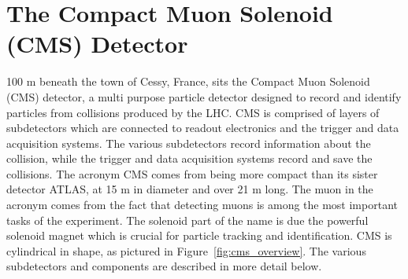 \section{The Compact Muon Solenoid (CMS) Detector}
\label{sec:cms}
100 m beneath the town of Cessy, France, sits the Compact Muon Solenoid (CMS) detector, a multi purpose particle detector designed
to record and identify particles from collisions produced by the LHC.
CMS is comprised of layers of subdetectors which are connected to readout electronics and the trigger and data acquisition systems.
The various subdetectors record information about the collision, while the trigger and
data acquisition systems record and save the collisions. The acronym CMS comes from being more compact than its sister detector ATLAS, at 15 m in diameter and
over 21 m long. The muon in the acronym comes from the fact that detecting muons is among the most important tasks of the experiment. The solenoid part of the name is due
the powerful solenoid magnet which is crucial for particle tracking and identification. 
CMS is cylindrical in shape, as pictured in Figure~\ref{fig:cms_overview}. The various subdetectors and components are described in more
detail below. 



